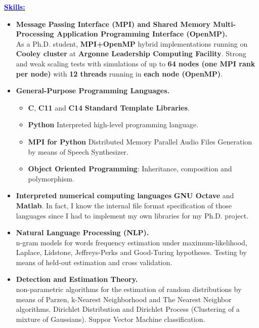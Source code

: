 \documentclass{article}
\newcommand{\CC}{C\nolinebreak\hspace{-.05em}\raisebox{.3ex}{\bf +}\nolinebreak\hspace{-.10em}\raisebox{.3ex}{\bf +}}
\newcommand{\statement}[1]{\par\medskip
  \underline{\textcolor{blue}{\textbf{#1:}}}\space
}
\begin{document}
\statement{Skills}

\begin{itemize}

	\item {\bf Message Passing Interface (MPI) and Shared Memory Multi-Processing Application Programming Interface (OpenMP).}\\
As a Ph.D. student, \textbf{MPI+OpenMP} hybrid implementations running on \textbf{Cooley cluster} at \textbf{Argonne Leadership Computing Facility}.
Strong and weak scaling tests with simulations of up to \textbf{64 nodes (one MPI rank per node)} with
\textbf{12 threads} running in \textbf{each node (OpenMP)}.
	
	\item {\bf General-Purpose Programming Languages.}
	\begin{itemize}
		\item \textbf{C}, \textbf{\CC11} and \textbf{\CC14} \textbf{Standard Template Libraries}.
		\item \textbf{Python} Interpreted high-level programming language.
		\item \textbf{MPI for Python} Distributed Memory Parallel Audio Files Generation by means of Speech Synthesizer.
		\item \textbf{Object Oriented Programming}: Inheritance, composition and polymorphism.
	\end{itemize}

	\item \textbf{Interpreted numerical computing languages}
\textbf{GNU Octave} and \textbf{Matlab}.
In fact, I know the internal file format specification of those languages
since I had to implement my own libraries for my Ph.D. project.

	\item {\bf Natural Language Processing (NLP).}\\
n-gram models for words frequency estimation
under maximum-likelihood, Laplace, Lidstone, Jeffreys-Perks
and Good-Turing hypotheses.
Testing by means of held-out estimation and cross validation.

	\item {\bf Detection and Estimation Theory.}\\
non-parametric algorithms for the estimation of random distributions
by means of Parzen, k-Nearest Neighborhood
and The Nearest Neighbor algorithms.
Dirichlet Distribution and Dirichlet Process
(Clustering of a mixture of Gaussians).
Suppor Vector Machine classification.


\end{itemize}
\end{document}
